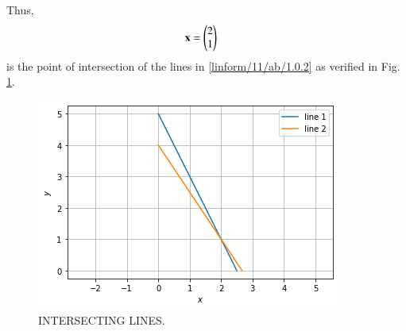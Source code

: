 Thus, 
\begin{align}
\mathbf{x}&= \begin{pmatrix}2 \\ 1\end{pmatrix}
\end{align} is the point of intersection of the lines in 
\eqref{linform/11/ab/1.0.2} as verified in Fig.     \ref{linform/11/ab/fig: INTERSECTING LINES.}.
%
\begin{figure}[ht]
    \centering
   \includegraphics[width=\columnwidth]{solutions/su2021/2/11/ab/Intersecting lines .png}
    \caption{INTERSECTING LINES.}
    \label{linform/11/ab/fig: INTERSECTING LINES.}
\end{figure}    

